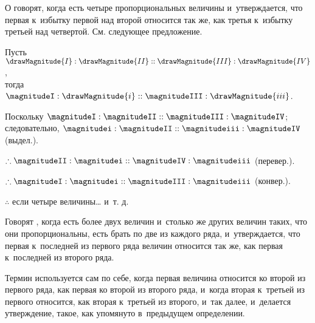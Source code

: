 \documentclass[letters]{byrne-book}
\begin{document}
\label{def:V.XVII} %
О  говорят, когда есть четыре пропорциональных величины и~утверждается, что первая к~избытку первой над второй относится так же, как третья к~избытку третьей над четвертой. См. следующее предложение.


\vfill\pagebreak


\label{prop:V.E}

\begin{center}
Пусть $\drawMagnitude{I} : \drawMagnitude{II} :: \drawMagnitude{III} : \drawMagnitude{IV}$,\\
тогда $\magnitudeI : \drawMagnitude{i} :: \magnitudeIII : \drawMagnitude{iii}$.

Поскольку $\magnitudeI : \magnitudeII :: \magnitudeIII : \magnitudeIV$;\\
следовательно, $\magnitudei : \magnitudeII :: \magnitudeiii : \magnitudeIV$ (выдел.).

$\therefore \magnitudeII : \magnitudei :: \magnitudeIV : \magnitudeiii$ (перевер.).

$\therefore \magnitudeI : \magnitudei :: \magnitudeIII : \magnitudeiii$ (конвер.).

$\therefore$ если четыре величины… и~т. д.
\end{center}

\label{def:V.XVIII}
Говорят , когда есть более двух величин и~столько же других величин таких, что они пропорциональны, есть брать по две из каждого ряда, и~утверждается, что первая к~последней из первого ряда величин относится так же, как первая к~последней из второго ряда.


\vfill\pagebreak


\label{def:V.XIX}
\def\varA{\textcolor{byred}{A}}
\def\varB{\textcolor{byred}{B}}
\def\varC{\textcolor{byyellow}{C}}
\def\varD{\textcolor{byyellow}{D}}
\def\varE{\textcolor{byblue}{E}}
\def\varF{\textcolor{byblue}{F}}
\def\varL{\textcolor{byred}{L}}
\def\varM{\textcolor{byred}{M}}
\def\varN{\textcolor{byyellow}{N}}
\def\varO{\textcolor{byyellow}{O}}
\def\varP{\textcolor{byblue}{P}}
\def\varQ{\textcolor{byblue}{Q}}
Термин  используется сам по себе, когда первая величина относится ко второй из первого ряда, как первая ко второй из второго ряда, и~когда вторая к~третьей из первого относится, как вторая к~третьей из второго, и~так далее, и~делается утверждение, такое, как упомянуто в~предыдущем определении.
\end{document}

